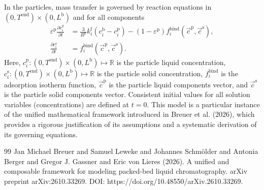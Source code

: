 \documentclass{article}
\begin{document}
In the particles, mass transfer is governed by reaction equations in $(0, T^{\mathrm{end}}) \times (0, L^{\mathrm{b}})$ and for all components
\begin{align}
    \varepsilon^{\mathrm{p}}\frac{\partial c^{\mathrm{p}}_{i}}{\partial t}
    &= \frac{3}{R^{\mathrm{p}}} k^{\mathrm{f}}_{i} \left( c^{\mathrm{b}}_{i} - c^{\mathrm{p}}_{i} \right)
        - \left( 1 - \varepsilon^{\mathrm{p}} \right) f^{\mathrm{bind}}_{i}\left( \vec{c}^{\mathrm{p}}, \vec{c}^{\mathrm{s}} \right),
    \\
    \frac{\partial c^{\mathrm{s}}_{i}}{\partial t}
    &= f^{\mathrm{bind}}_{i}\left( \vec{c}^{\mathrm{p}}, \vec{c}^{\mathrm{s}} \right).
\end{align}
Here, $c^{\mathrm{p}}_{i}\colon (0, T^{\mathrm{end}}) \times (0, L^{\mathrm{b}}) \mapsto \mathbb{R}$ is the particle liquid concentration, $c^{\mathrm{s}}_{i}\colon (0, T^{\mathrm{end}}) \times (0, L^{\mathrm{b}}) \mapsto \mathbb{R}$ is the particle solid concentration, $f^{\mathrm{bind}}_{i}$ is the adsorption isotherm function, $\vec{c}^{\mathrm{p}}$ is the particle liquid components vector, and $\vec{c}^{\mathrm{s}}$ is the particle solid components vector.
Consistent initial values for all solution variables (concentrations) are defined at $t = 0$.
This model is a particular instance of the unified mathematical framework introduced in Breuer et al. (2026), which provides a rigorous justification of its assumptions and a systematic derivation of its governing equations.
\begin{thebibliography}{99}
     Jan Michael Breuer and Samuel Leweke and Johannes Schmölder and Antonia Berger and Gregor J. Gassner and Eric von Lieres (2026). A unified and composable framework for modeling packed-bed liquid chromatography. arXiv preprint arXiv:2610.33269. DOI: https://doi.org/10.48550/arXiv.2610.33269.
\end{thebibliography}
\end{document}
